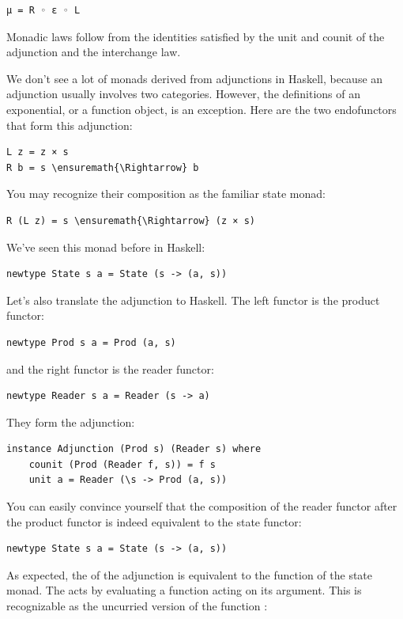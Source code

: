 \begin{verbatim}
μ = R ◦ ε ◦ L
\end{verbatim}
Monadic laws follow from the identities satisfied by the unit and counit
of the adjunction and the interchange law.

We don't see a lot of monads derived from adjunctions in Haskell,
because an adjunction usually involves two categories. However, the
definitions of an exponential, or a function object, is an exception.
Here are the two endofunctors that form this adjunction:

\begin{Verbatim}[commandchars=\\\{\}]
L z = z × s
R b = s \ensuremath{\Rightarrow} b
\end{Verbatim}
You may recognize their composition as the familiar state monad:

\begin{Verbatim}[commandchars=\\\{\}]
R (L z) = s \ensuremath{\Rightarrow} (z × s)
\end{Verbatim}
We've seen this monad before in Haskell:

\begin{verbatim}
newtype State s a = State (s -> (a, s))
\end{verbatim}
Let's also translate the adjunction to Haskell. The left functor is the
product functor:

\begin{verbatim}
newtype Prod s a = Prod (a, s)
\end{verbatim}
and the right functor is the reader functor:

\begin{verbatim}
newtype Reader s a = Reader (s -> a)
\end{verbatim}
They form the adjunction:

\begin{verbatim}
instance Adjunction (Prod s) (Reader s) where
    counit (Prod (Reader f, s)) = f s
    unit a = Reader (\s -> Prod (a, s))
\end{verbatim}
You can easily convince yourself that the composition of the reader
functor after the product functor is indeed equivalent to the state
functor:

\begin{verbatim}
newtype State s a = State (s -> (a, s))
\end{verbatim}
As expected, the  of the adjunction is equivalent to the
 function of the state monad. The  acts by
evaluating a function acting on its argument. This is recognizable as
the uncurried version of the function :

